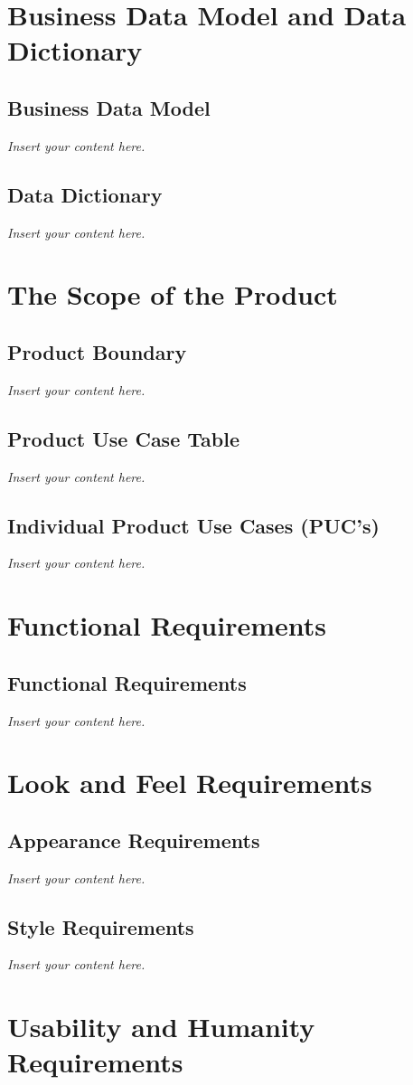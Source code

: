 \documentclass[12pt]{article}
\newcommand{\lips}{\textit{Insert your content here.}}
\begin{document}
\section{Business Data Model and Data Dictionary}
\subsection{Business Data Model}
\lips
\subsection{Data Dictionary}
\lips

\section{The Scope of the Product}
\subsection{Product Boundary}
\lips
\subsection{Product Use Case Table}
\lips
\subsection{Individual Product Use Cases (PUC's)}
\lips

\section{Functional Requirements}
\subsection{Functional Requirements}
\lips

\section{Look and Feel Requirements}
\subsection{Appearance Requirements}
\lips
\subsection{Style Requirements}
\lips

\section{Usability and Humanity Requirements}
\end{document}
